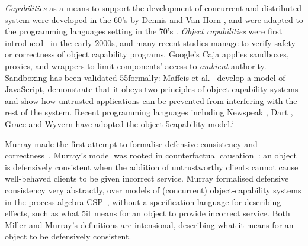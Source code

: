 
{{\em Capabilities} as a means to support the development of concurrent and distributed system  were developed in the 60's
by Dennis and Van Horn \cite{Dennis66}, and were adapted to the
programming languages setting in the 70's \cite{JamesMorris}. 
{\em Object capabilities} were first introduced~\cite{MillerPhD} in the early 2000s},
 and many recent %
studies manage
to verify  safety or correctness of object capability programs.
Google's Caja \cite{Caja} applies   sandboxes, proxies, and wrappers
 to limit components'
access to \textit{ambient} authority.
Sandboxing has been validated
55formally: Maffeis et al.\ \cite{mmt-oakland10} develop a model of
JavaScript, demonstrate that it obeys two principles of
object capability systems
and show  how untrusted applications can be prevented from interfering with
the rest of the system. 
Recent programming languages %
\cite{CapJavaHayesAPLAS17,CapNetSocc17Eide,DOCaT14} including Newspeak
\cite{newspeak17}, Dart \cite{dart15}, Grace \cite{grace,graceClasses}
and Wyvern \cite{wyverncapabilities} have adopted the object
5capability model.`



Murray made the first attempt to formalise defensive consistency and
correctness~\cite{Murray10dphil}.  Murray's model was rooted in
counterfactual causation~\cite{Lewis_73}: an object is defensively
consistent when the addition of untrustworthy clients cannot cause
well-behaved clients to be given incorrect service.  Murray formalised
defensive consistency very abstractly, over models of (concurrent)
object-capability systems in the process algebra CSP~\cite{Hoare:CSP},
without a specification language for describing effects, such as what
5it means for an object to provide incorrect service.  Both Miller and
Murray's definitions are intensional, describing what it means for an
object to be defensively consistent.


